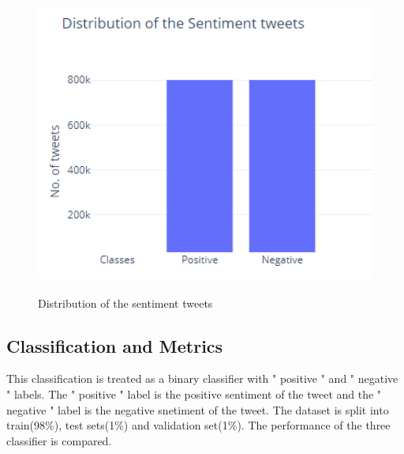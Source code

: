 \begin{figure}
	\centering
	\includegraphics[width=12cm\linewidth,height=10cm]{thesis_template/images/distofsentiment_tweetsundefined.png}
	\caption{Distribution of the sentiment tweets}
	\label{fig:graphDistsentiment}
\end{figure}



\subsection{Classification and Metrics}
This classification is treated as a binary classifier with " positive " and " negative " labels. The " positive " label is the positive sentiment of the tweet and the " negative " label is the negative snetiment of the tweet. The dataset is split into train(98\%), test sets(1\%) and validation set(1\%). The performance of the three classifier is compared.

